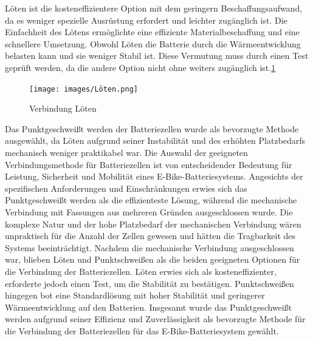 Löten ist die kosteneffizientere Option mit dem geringern Beschaffungsaufwand, da es weniger spezielle Ausrüstung erfordert und leichter zugänglich ist. Die Einfachheit des Lötens ermöglichte eine effiziente Materialbeschaffung und eine schnellere Umsetzung. Obwohl Löten die Batterie durch die Wärmeentwicklung belasten kann und sie weniger Stabil ist. Diese Vermutung muss durch einen Test geprüft werden, da die andere Option nicht ohne weiters zugänglich ist.\ref{fig:4}\\
\begin{figure}[ht]
    \centering
    \texttt{[image: images/Löten.png]}
    \caption{Verbindung Löten\cite{LorenzScherrer.02.03.2024}}
    \label{fig:4}
\end{figure}

Das Punktgeschweißt werden der Batteriezellen wurde als bevorzugte Methode ausgewählt, da Löten aufgrund seiner Instabilität und des erhöhten Platzbedarfs mechanisch weniger praktikabel war. Die Auswahl der geeigneten Verbindungsmethode für Batteriezellen ist von entscheidender Bedeutung für Leistung, Sicherheit und Mobilität eines E-Bike-Batteriesystems. Angesichts der spezifischen Anforderungen und Einschränkungen erwies sich das Punktgeschweißt werden als die effizienteste Lösung, während die mechanische Verbindung mit Fassungen aus mehreren Gründen ausgeschlossen wurde. Die komplexe Natur und der hohe Platzbedarf der mechanischen Verbindung wären unpraktisch für die Anzahl der Zellen gewesen und hätten die Tragbarkeit des Systems beeinträchtigt. Nachdem die mechanische Verbindung ausgeschlossen war, blieben Löten und Punktschweißen als die beiden geeigneten Optionen für die Verbindung der Batteriezellen. Löten erwies sich als kosteneffizienter, erforderte jedoch einen Test, um die Stabilität zu bestätigen. Punktschweißen hingegen bot eine Standardlösung mit hoher Stabilität und geringerer Wärmeentwicklung auf den Batterien. Insgesamt wurde das Punktgeschweißt werden aufgrund seiner Effizienz und Zuverlässigkeit als bevorzugte Methode für die Verbindung der Batteriezellen für das E-Bike-Batteriesystem gewählt.\\




